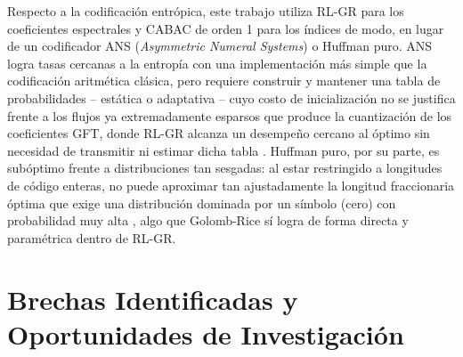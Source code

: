     Respecto a la codificación entrópica, este trabajo utiliza RL-GR \cite{malvar2006adaptive}
    para los coeficientes espectrales y CABAC de orden 1 para los índices de modo, en lugar
    de un codificador ANS (\textit{Asymmetric Numeral Systems}) o Huffman puro. ANS logra
    tasas cercanas a la entropía con una implementación más simple que la codificación
    aritmética clásica, pero requiere construir y mantener una tabla de probabilidades
    -- estática o adaptativa -- cuyo costo de inicialización no se justifica frente a los
    flujos ya extremadamente esparsos que produce la cuantización de los coeficientes GFT,
    donde RL-GR alcanza un desempeño cercano al óptimo sin necesidad de transmitir ni
    estimar dicha tabla \cite{malvar2006adaptive,sayood2006introduction}. Huffman puro, por
    su parte, es subóptimo frente a distribuciones tan sesgadas: al estar restringido a
    longitudes de código enteras, no puede aproximar tan ajustadamente la longitud
    fraccionaria óptima que exige una distribución dominada por un símbolo (cero) con
    probabilidad muy alta \cite{mackay_nodate}, algo que Golomb-Rice sí logra de forma
    directa y paramétrica dentro de RL-GR.


\section{Brechas Identificadas y Oportunidades de Investigación}


